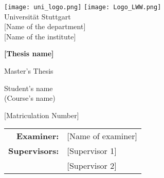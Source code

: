 \begin{titlepage}
	\begin{large}
	\begin{center}
	\texttt{[image: uni\_logo.png]}
	\hspace*{4in}
	\texttt{[image: Logo\_LWW.png]}\\
		Universit{\"a}t Stuttgart\\
		\vspace{1cm}
		[Name of the department]\\
		
		[Name of the institute]\\
		
		\vspace{1.0cm}
		\begin{Huge}
			\textbf{[Thesis name]}\\
		\end{Huge}
		\vspace{1.5cm}
		Master's Thesis %
		
		\vspace{1.5cm}
		Student's name\\
		(Course's name)
		\vspace{1.5cm}
		
		[Matriculation Number] \\
		
		\date{\today}
	\end{center}
		\vspace{1.5cm}
		\begin{tabular}{rl}
			\textbf{Examiner:} & [Name of examiner] \\
			\textbf{Supervisors:} & [Supervisor 1] \\ & [Supervisor 2]
		\end{tabular}
	
	\end{large}
\end{titlepage}
		